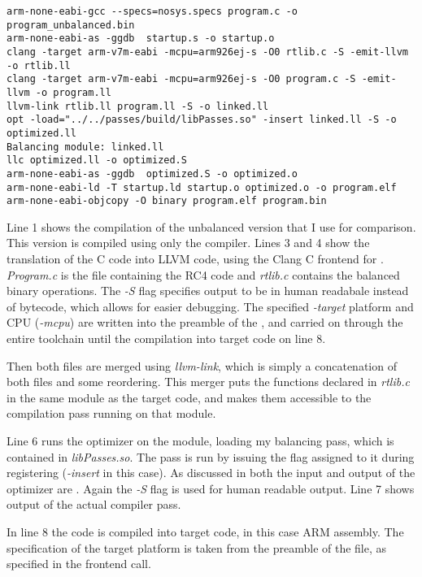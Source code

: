 \begin{lstlisting}[caption=Output of the Makefile, label=lst:makefile-output]
arm-none-eabi-gcc --specs=nosys.specs program.c -o program_unbalanced.bin
arm-none-eabi-as -ggdb  startup.s -o startup.o
clang -target arm-v7m-eabi -mcpu=arm926ej-s -O0 rtlib.c -S -emit-llvm -o rtlib.ll
clang -target arm-v7m-eabi -mcpu=arm926ej-s -O0 program.c -S -emit-llvm -o program.ll
llvm-link rtlib.ll program.ll -S -o linked.ll
opt -load="../../passes/build/libPasses.so" -insert linked.ll -S -o optimized.ll
Balancing module: linked.ll
llc optimized.ll -o optimized.S
arm-none-eabi-as -ggdb  optimized.S -o optimized.o
arm-none-eabi-ld -T startup.ld startup.o optimized.o -o program.elf
arm-none-eabi-objcopy -O binary program.elf program.bin
\end{lstlisting}

Line 1 shows the compilation of the unbalanced version that I use for comparison.
This version is compiled using only the \crossgcc{} compiler.
Lines 3 and 4 show the translation of the C code into LLVM code, using the Clang\cite{lattner2008llvm} C frontend for \llvm{}.
\emph{Program.c} is the file containing the RC4 code and \emph{rtlib.c} contains the balanced binary operations.
The \emph{-S} flag specifies output to be in human readabale \ir{} instead of bytecode, which allows for easier debugging.
The specified \emph{-target} platform and CPU (\emph{-mcpu}) are written into the preamble of the \ir{}, and carried on through the entire toolchain until the compilation into target code on line 8.

Then both \llvm{} files are merged using \emph{llvm-link}, which is simply a concatenation of both files and some reordering.
This merger puts the functions declared in \emph{rtlib.c} in the same module as the target code, and makes them accessible to the compilation pass running on that module.

Line 6 runs the \llvm{} optimizer on the module, loading my balancing pass, which is contained in \emph{libPasses.so}.
The pass is run by issuing the flag assigned to it during registering (\emph{-insert} in this case).
As discussed in  both the input and output of the optimizer are \ir{}.
Again the \emph{-S} flag is used for human readable output.
Line 7 shows output of the actual compiler pass.

In line 8 the \ir{} code is compiled into target code, in this case ARM assembly.
The specification of the target platform is taken from the preamble of the \ir{} file, as specified in the frontend call.

